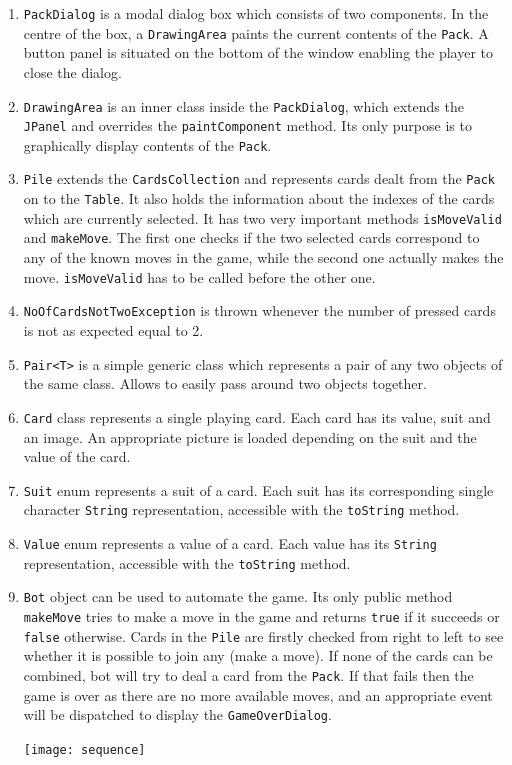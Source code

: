 \documentclass[a4paper, 11pt, titlepage]{article}
\begin{document}
\begin{enumerate}
	\item \texttt{PackDialog} is a modal dialog box which consists of two components. 
		In the centre of the box, a \texttt{DrawingArea} paints the current contents of the
		\texttt{Pack}. A button panel is situated on the bottom of the window enabling
		the player to close the dialog.  
	
	\item \texttt{DrawingArea} is an inner class inside the \texttt{PackDialog}, which 
		extends the \texttt{JPanel} and overrides the \texttt{paintComponent} method. Its
		only purpose is to graphically display contents of the \texttt{Pack}.		
	
	\item \texttt{Pile} extends the \texttt{CardsCollection} and represents cards 
		dealt from the \texttt{Pack} on to the \texttt{Table}. It also holds the 
		information about the indexes of the cards which are currently selected. It has 
		two very important methods \texttt{isMoveValid} and \texttt{makeMove}. The first one 
		checks if the two selected cards correspond to any of the known moves in the 
		game, while the second one actually makes the move. \texttt{isMoveValid} has to 
		be called before the other one. 

	\item \texttt{NoOfCardsNotTwoException} is thrown whenever the number of pressed 
		cards is not as expected equal to 2. 
	
	\item \texttt{Pair<T>} is a simple generic class which represents a pair of any two 
		objects of the same class. Allows to easily pass around two objects together.

	\item \texttt{Card} class represents a single playing card. Each card has its value, 
		suit and an image. An appropriate picture is loaded depending on the suit and
		the value of the card. 
	
	\item \texttt{Suit} enum represents a suit of a card. Each suit has its corresponding
		single character \texttt{String} representation, accessible with the \texttt{toString} 
		method.
	
	\item \texttt{Value} enum represents a value of a card. Each value has its \texttt{String} 
		representation, accessible with the \texttt{toString} method.

	\item \texttt{Bot} object can be used to automate the game. Its only public method
		\texttt{makeMove} tries to make a move in the game and returns \texttt{true} if
		it succeeds or \texttt{false} otherwise. Cards in the \texttt{Pile} are firstly 
		checked from right to left to see whether it is possible to join any (make a 
		move). If none of the cards can be combined, bot will try to deal a card from 
		the \texttt{Pack}. If that fails then the game is over as there are no more
		available moves, and an appropriate event will be dispatched to display the
		\texttt{GameOverDialog}.
		
		\texttt{[image: sequence]}
	
\end{enumerate}
\end{document}
